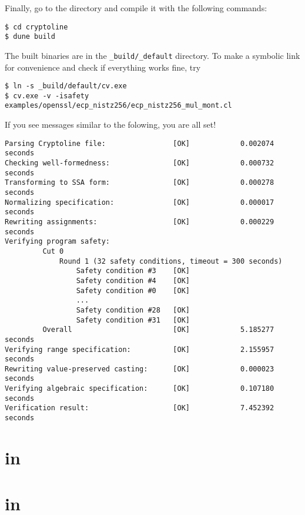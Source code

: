 \documentclass{amsproc}
\begin{document}
Finally, go to the \cryptoline directory and compile it with the
following commands:
\begin{verbatim}
$ cd cryptoline
$ dune build
\end{verbatim}

The built \cryptoline binaries are in the \texttt{\_build/\_default}
directory. To make a symbolic link for convenience and check if
everything works fine, try
\begin{verbatim}
$ ln -s _build/default/cv.exe
$ cv.exe -v -isafety examples/openssl/ecp_nistz256/ecp_nistz256_mul_mont.cl
\end{verbatim}

If you see messages similar to the folowing, you are all set!
\begin{verbatim}
Parsing Cryptoline file:                [OK]            0.002074 seconds
Checking well-formedness:               [OK]            0.000732 seconds
Transforming to SSA form:               [OK]            0.000278 seconds
Normalizing specification:              [OK]            0.000017 seconds
Rewriting assignments:                  [OK]            0.000229 seconds
Verifying program safety:
         Cut 0
             Round 1 (32 safety conditions, timeout = 300 seconds)
                 Safety condition #3    [OK]
                 Safety condition #4    [OK]
                 Safety condition #0    [OK]
                 ...
                 Safety condition #28   [OK]
                 Safety condition #31   [OK]
         Overall                        [OK]            5.185277 seconds
Verifying range specification:          [OK]            2.155957 seconds
Rewriting value-preserved casting:      [OK]            0.000023 seconds
Verifying algebraic specification:      [OK]            0.107180 seconds
Verification result:                    [OK]            7.452392 seconds 
\end{verbatim}



\section{\nistzadd in \openssl}



\section{\nistzmul in \openssl}
\end{document}
